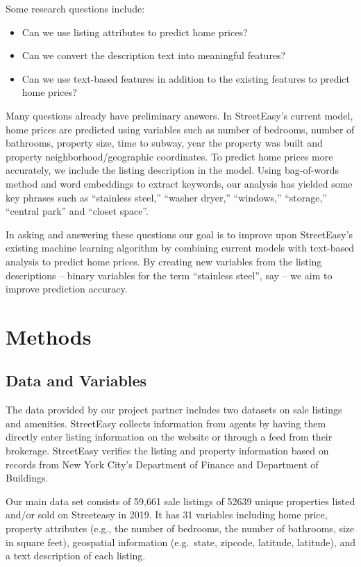 \documentclass[10pt,letterpaper]{article}
\providecommand{\tightlist}{%
  \setlength{\itemsep}{0pt}\setlength{\parskip}{0pt}}
\begin{document}
Some research questions include:

\begin{itemize}
\tightlist
\item
  Can we use listing attributes to predict home prices?
\item
  Can we convert the description text into meaningful features?
\item
  Can we use text-based features in addition to the existing features to
  predict home prices?
\end{itemize}

Many questions already have preliminary answers. In StreetEasy's current
model, home prices are predicted using variables such as number of
bedrooms, number of bathrooms, property size, time to subway, year the
property was built and property neighborhood/geographic coordinates. To
predict home prices more accurately, we include the listing description
in the model. Using bag-of-words method and word embeddings to extract
keywords, our analysis has yielded some key phrases such as ``stainless
steel,'' ``washer dryer,'' ``windows,'' ``storage,'' ``central park''
and ``closet space''.

In asking and answering these questions our goal is to improve upon
StreetEasy's existing machine learning algorithm by combining current
models with text-based analysis to predict home prices. By creating new
variables from the listing descriptions -- binary variables for the term
``stainless steel'', say -- we aim to improve prediction accuracy.

\hypertarget{methods}{%
\section{Methods}\label{methods}}

\hypertarget{data-and-variables}{%
\subsection{Data and Variables}\label{data-and-variables}}

The data provided by our project partner includes two datasets on sale
listings and amenities. StreetEasy collects information from agents by
having them directly enter listing information on the website or through
a feed from their brokerage. StreetEasy verifies the listing and
property information based on records from New York City's Department of
Finance and Department of Buildings.

Our main data set consists of 59,661 sale listings of 52639 unique
properties listed and/or sold on Streeteasy in 2019. It has 31 variables
including home price, property attributes (e.g., the number of bedrooms,
the number of bathrooms, size in square feet), geospatial information
(e.g.~state, zipcode, latitude, latitude), and a text description of
each listing.
\end{document}
